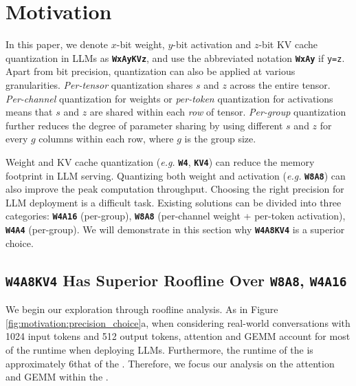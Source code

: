 \section{Motivation}
\label{sect:motivation}

In this paper, we denote $x$-bit weight, $y$-bit activation and $z$-bit KV cache quantization in LLMs as \textbf{\texttt{WxAyKVz}}, and use the abbreviated notation \textbf{\texttt{WxAy}} if \texttt{y=z}.  Apart from bit precision, quantization can also be applied at various granularities. \textit{Per-tensor} quantization shares $s$ and $z$ across the entire tensor. \textit{Per-channel} quantization for weights or \textit{per-token} quantization for activations means that $s$ and $z$ are shared within each \textit{row} of tensor. \textit{Per-group} quantization further reduces the degree of parameter sharing by using different $s$ and $z$ for every $g$ columns within each row, where $g$ is the group size.


Weight and KV cache quantization (\textit{e.g.} \textbf{\texttt{W4}},\textbf{ \texttt{KV4}}) can reduce the memory footprint in LLM serving. Quantizing both weight and activation (\textit{e.g.} \textbf{\texttt{W8A8}}) can also improve the peak computation throughput. Choosing the right precision for LLM deployment is a difficult task. Existing solutions can be divided into three categories: \textbf{\texttt{W4A16}} (per-group), \textbf{\texttt{W8A8}} (per-channel weight + per-token activation), \textbf{\texttt{W4A4}} (per-group). We will demonstrate in this section why \textbf{\texttt{W4A8KV4}} is a superior choice.  


\subsection{\textbf{\texttt{W4A8KV4}} Has Superior Roofline Over \textbf{\texttt{W8A8}}, \textbf{\texttt{W4A16}}}





We begin our exploration through roofline analysis. As in Figure \ref{fig:motivation:precision_choice}a, when considering real-world conversations with 1024 input tokens and 512 output tokens, attention and GEMM account for most of the runtime when deploying LLMs. Furthermore, the runtime of the \decodingstage is approximately 6\x that of the \contextstage. Therefore, we focus our analysis on the attention and GEMM within the \decodingstage. 

